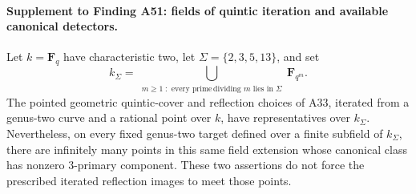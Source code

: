\paragraph{Supplement to Finding A51: fields of quintic iteration and available canonical detectors.}
Let $k=\mathbf F_q$ have characteristic two, let
$\Sigma=\{2,3,5,13\}$, and set
\[
 k_\Sigma=\bigcup_{\substack{m\ge1\;:\text{ every prime}\,
                              \text{dividing }m\text{ lies in }\Sigma}}
                              \mathbf F_{q^m}.
 \tag{FI.1}
\]
The pointed geometric quintic-cover and reflection choices of A33,
iterated from a genus-two curve and a rational point over $k$, have
representatives over $k_\Sigma$. Nevertheless, on every fixed
genus-two target defined over a finite subfield of $k_\Sigma$,
there are infinitely many points in this same field extension whose
canonical class has nonzero $3$-primary component. These two assertions
do not force the prescribed iterated reflection images to meet those
points.


